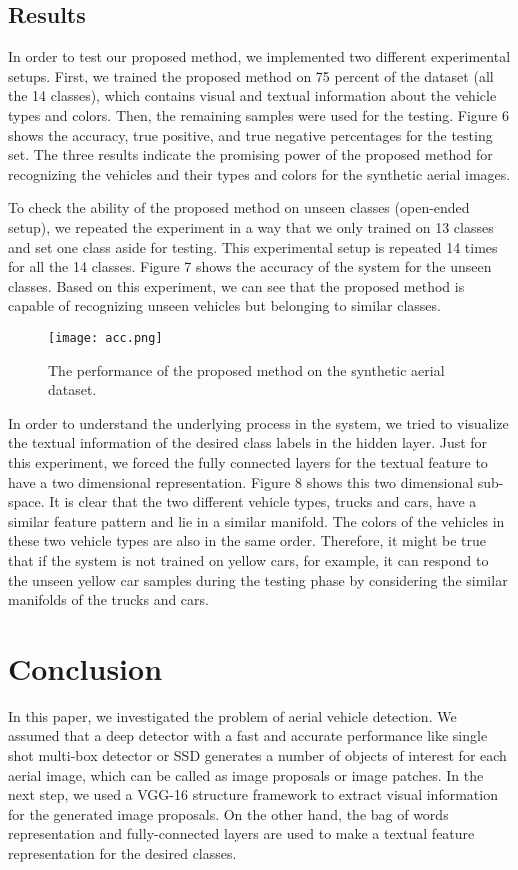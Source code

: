 \documentclass[conference]{IEEEtran}
\begin{document}
\subsection{Results}

In order to test our proposed method, we implemented two different experimental setups. First, we trained the proposed method on 75 percent of the dataset (all the 14 classes), which contains visual and textual information about the vehicle types and colors. Then, the remaining samples were used for the testing. Figure 6 shows the accuracy, true positive, and true negative percentages for the testing set. The three results indicate the promising power of the proposed method for recognizing the vehicles and their types and colors for the synthetic aerial images. 

To check the ability of the proposed method on unseen classes (open-ended setup), we repeated the experiment in a way that we only trained on 13 classes and set one class aside for testing. This experimental setup is repeated 14 times for all the 14 classes. Figure 7 shows the accuracy of the system for the unseen classes. Based on this experiment, we can see that the proposed method is capable of recognizing unseen vehicles but belonging to similar classes.


\begin{figure}[!t]
\centering
\texttt{[image: acc.png]}
\caption{The performance of the proposed method on the synthetic aerial dataset.}
\label{fig_graph4}
\end{figure}



In order to understand the underlying process in the system, we tried to visualize the textual information of the desired class labels in the hidden layer. Just for this experiment, we forced the fully connected layers for the textual feature to have a two dimensional representation. Figure 8 shows this two dimensional sub-space. It is clear that the two different vehicle types, trucks and cars, have a similar feature pattern and lie in a similar manifold. The colors of the vehicles in these two vehicle types are also in the same order. Therefore, it might be true that if the system is not trained on yellow cars, for example, it can respond to the unseen yellow car samples during the testing phase by considering the similar manifolds of the trucks and cars.\\



\section{Conclusion}
In this paper, we investigated the problem of aerial vehicle detection. We assumed that a deep detector with a fast and accurate performance like single shot multi-box detector or SSD generates a number of objects of interest for each aerial image, which can be called as image proposals or image patches. In the next step, we used a VGG-16 structure framework to extract visual information for the generated image proposals. On the other hand, the bag of words representation and fully-connected layers are used to make a textual feature representation for the desired classes. 
\end{document}
